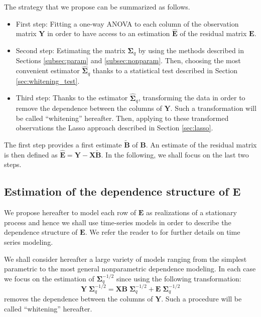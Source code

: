 The strategy that we propose can be summarized as follows.
\begin{itemize}
\item \textsf{First step:} Fitting a one-way ANOVA to each column of the observation matrix 
  $\boldsymbol{Y}$ in order to have access to an
  estimation $\widehat{\boldsymbol{E}}$ of the residual matrix
  $\boldsymbol{E}$.
\item \textsf{Second step:} Estimating the matrix
  $\boldsymbol{\Sigma}_q$ by using the methods described in Sections
  \ref{subsec:param} and \ref{subsec:nonparam}. Then, choosing the
  most convenient estimator $\widehat{\boldsymbol{\Sigma}}_q$
  thanks to a statistical test described in Section \ref{sec:whitening_test}.
\item \textsf{Third step:} Thanks to the estimator $\widehat{\boldsymbol{\Sigma}}_q$, transforming the
  data in order to remove the dependence between the columns of
  $\boldsymbol{Y}$. Such a transformation will be called ``whitening'' hereafter.
  Then, applying to these
  transformed observations the Lasso approach described in Section \ref{sec:lasso}.
\end{itemize}

The first step provides  a first estimate $\widetilde{\boldsymbol{B}}$
of $\boldsymbol{B}$. An estimate of the residual  matrix is then
defined                                                             as
$\widehat{\boldsymbol{E}}    =    \boldsymbol{Y}   -    \boldsymbol{X}
\widetilde{\boldsymbol{B}}$.
In the following, we shall focus on the last two steps.



\subsection{Estimation of the dependence structure of $\boldsymbol{E}$}\label{sec:estim_sigma_q}


We propose hereafter to model each row of $\boldsymbol{E}$ as realizations 
of a stationary process and hence we shall use time-series models in order
to  describe the  dependence structure of  $\boldsymbol{E}$. We refer the reader to \cite{brockwell:davis} for further
details on time series modeling.   

We  shall consider  hereafter  a  large variety  of  models
ranging from the simplest parametric to the most general nonparametric
dependence  modeling.  In  each case  we  focus on  the estimation  of
$\boldsymbol{\Sigma}_q^{-1/2}$     since    using     the    following
transformation:
\begin{equation}\label{eq:modele:blanchi_est}
\boldsymbol{Y}\;\boldsymbol{\Sigma}_q^{-1/2}=\boldsymbol{X}\boldsymbol{B}\;\boldsymbol{\Sigma}_q^{-1/2}
+\boldsymbol{E}\;\boldsymbol{\Sigma}_q^{-1/2}
\end{equation}
removes the dependence between the columns of $\boldsymbol{Y}$. Such a procedure will be called ``whitening'' hereafter.



